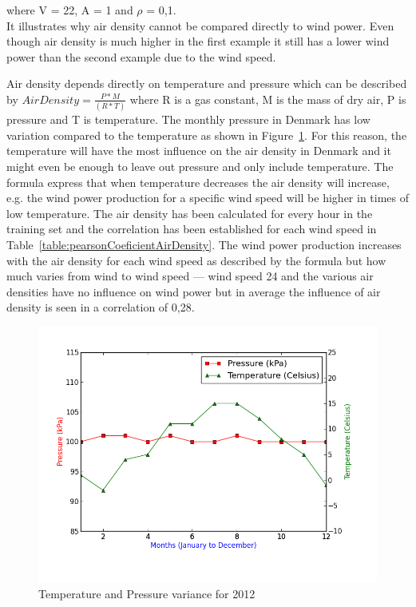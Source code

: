 \noindent where V = 22, A = 1 and $\rho$ =  0,1.
\\[0.5cm]
\noindent It illustrates why air density cannot be compared directly to wind power. Even though air density is much higher in the first example it still has a lower wind power than the second example due to the wind speed.

Air density depends directly on temperature and pressure which can be described by $Air Density=\frac{P*M}{(R*T)}$ where R is a gas constant, M is the mass of dry air, P is pressure and T is temperature. The monthly pressure in Denmark has low variation compared to the temperature as shown in Figure~\ref{fig:pressureTemperatureVariance}. For this reason, the temperature will have the most influence on the air density in Denmark and it might even be enough to leave out pressure and only include temperature. The formula express that when temperature decreases the air density will increase, e.g. the wind power production for a specific wind speed will be higher in times of low temperature. The air density has been calculated for every hour in the training set and the correlation has been established for each wind speed in Table~\ref{table:pearsonCoeficientAirDensity}. The wind power production increases with the air density for each wind speed as described by the formula but how much varies from wind to wind speed --- wind speed 24 and the various air densities have no influence on wind power but in average the influence of air density is seen in a correlation of 0,28.

\begin{figure}[H]
\centering
\includegraphics[width=0.99\linewidth,natwidth=898,natheight=587]{billeder/pressureTemperatureVariance.png}
\caption{Temperature and Pressure variance for 2012}
\label{fig:pressureTemperatureVariance}
\end{figure}

